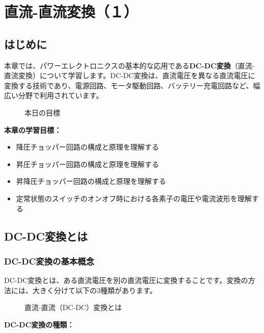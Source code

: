 \chapter{直流-直流変換（１）}

\section{はじめに}

本章では、パワーエレクトロニクスの基本的な応用である\textbf{DC-DC変換}（直流-直流変換）について学習します。DC-DC変換は、直流電圧を異なる直流電圧に変換する技術であり、電源回路、モータ駆動回路、バッテリー充電回路など、幅広い分野で利用されています。

\begin{figure}[H]
\centering
{}
\caption{本日の目標}
\label{fig:ch05_objectives}
\end{figure}

\textbf{本章の学習目標：}

\begin{itemize}
\item 降圧チョッパー回路の構成と原理を理解する
\item 昇圧チョッパー回路の構成と原理を理解する
\item 昇降圧チョッパー回路の構成と原理を理解する
\item 定常状態のスイッチのオンオフ時における各素子の電圧や電流波形を理解する
\end{itemize}

\section{DC-DC変換とは}

\subsection{DC-DC変換の基本概念}

DC-DC変換とは、ある直流電圧を別の直流電圧に変換することです。変換の方法には、大きく分けて以下の3種類があります。

\begin{figure}[H]
\centering
{}
\caption{直流-直流（DC-DC）変換とは}
\label{fig:ch05_dcdc_overview}
\end{figure}

\textbf{DC-DC変換の種類：}

